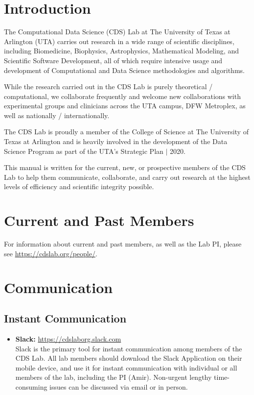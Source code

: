 \section{Introduction}
\label{sec:intro}

    The Computational Data Science (CDS) Lab at The University of Texas at Arlington (UTA) carries out research in a wide range of scientific disciplines, including Biomedicine, Biophysics, Astrophysics, Mathematical Modeling, and Scientific Software Development, all of which require intensive usage and development of Computational and Data Science methodologies and algorithms.

    While the research carried out in the CDS Lab is purely theoretical / computational, we collaborate frequently and welcome new collaborations with experimental groups and clinicians across the UTA campus, DFW Metroplex, as well as nationally / internationally.

    The CDS Lab is proudly a member of the College of Science at The University of Texas at Arlington and is heavily involved in the development of the Data Science Program as part of the UTA's Strategic Plan $\vert$ 2020.

    This manual is written for the current, new, or prospective members of the CDS Lab to help them communicate, collaborate, and carry out research at the highest levels of efficiency and scientific integrity possible.

\section{Current and Past Members}
\label{sec:members}

    For information about current and past members, as well as the Lab PI, please see \url{https://cdslab.org/people/}.

\section{Communication}
\label{sec:communication:instant}

\subsection{Instant Communication}
\label{sec:communication:instant}

    \begin{itemize}

        \item
            {\bf Slack:} \url{https://cdslaborg.slack.com} \\
            Slack is the primary tool for instant communication among members of the CDS Lab. All lab members should download the Slack Application on their mobile device, and use it for instant communication with individual or all members of the lab, including the PI (Amir). Non-urgent lengthy time-consuming issues can be discussed via email or in person.

    \end{itemize}

